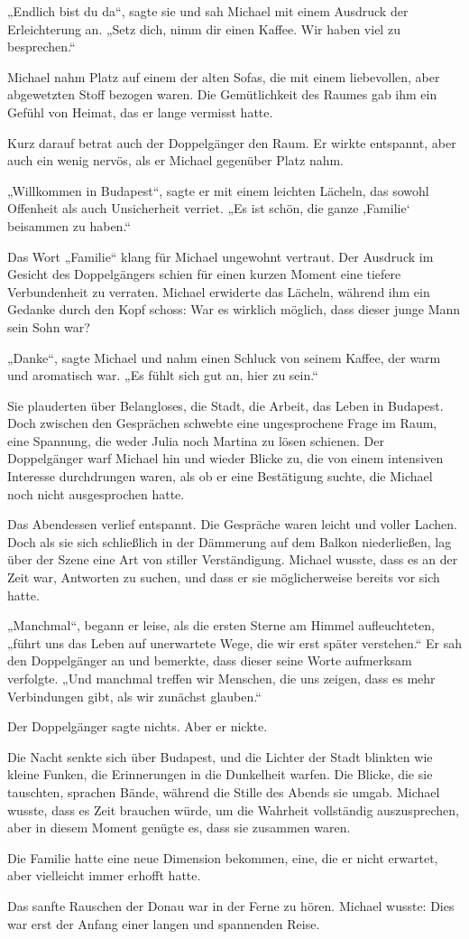 \documentclass[
]{article}
\begin{document}
„Endlich bist du da``, sagte sie und sah Michael mit einem Ausdruck der Erleichterung an. „Setz dich, nimm dir einen Kaffee. Wir haben viel zu besprechen.``

Michael nahm Platz auf einem der alten Sofas, die mit einem liebevollen, aber abgewetzten Stoff bezogen waren. Die Gemütlichkeit des Raumes gab ihm ein Gefühl von Heimat, das er lange vermisst hatte.

Kurz darauf betrat auch der Doppelgänger den Raum. Er wirkte entspannt, aber auch ein wenig nervös, als er Michael gegenüber Platz nahm.

„Willkommen in Budapest``, sagte er mit einem leichten Lächeln, das sowohl Offenheit als auch Unsicherheit verriet. „Es ist schön, die ganze ‚Familie` beisammen zu haben.``

Das Wort „Familie`` klang für Michael ungewohnt vertraut. Der Ausdruck im Gesicht des Doppelgängers schien für einen kurzen Moment eine tiefere Verbundenheit zu verraten. Michael erwiderte das Lächeln, während ihm ein Gedanke durch den Kopf schoss: War es wirklich möglich, dass dieser junge Mann sein Sohn war?

„Danke``, sagte Michael und nahm einen Schluck von seinem Kaffee, der warm und aromatisch war. „Es fühlt sich gut an, hier zu sein.``



Sie plauderten über Belangloses, die Stadt, die Arbeit, das Leben in Budapest. Doch zwischen den Gesprächen schwebte eine ungesprochene Frage im Raum, eine Spannung, die weder Julia noch Martina zu lösen schienen. Der Doppelgänger warf Michael hin und wieder Blicke zu, die von einem intensiven Interesse durchdrungen waren, als ob er eine Bestätigung suchte, die Michael noch nicht ausgesprochen hatte.

Das Abendessen verlief entspannt. Die Gespräche waren leicht und voller Lachen. Doch als sie sich schließlich in der Dämmerung auf dem Balkon niederließen, lag über der Szene eine Art von stiller Verständigung. Michael wusste, dass es an der Zeit war, Antworten zu suchen, und dass er sie möglicherweise bereits vor sich hatte.

„Manchmal``, begann er leise, als die ersten Sterne am Himmel aufleuchteten, „führt uns das Leben auf unerwartete Wege, die wir erst später verstehen.`` Er sah den Doppelgänger an und bemerkte, dass dieser seine Worte aufmerksam verfolgte. „Und manchmal treffen wir Menschen, die uns zeigen, dass es mehr Verbindungen gibt, als wir zunächst glauben.``

Der Doppelgänger sagte nichts. Aber er nickte.

Die Nacht senkte sich über Budapest, und die Lichter der Stadt blinkten wie kleine Funken, die Erinnerungen in die Dunkelheit warfen. Die Blicke, die sie tauschten, sprachen Bände, während die Stille des Abends sie umgab. Michael wusste, dass es Zeit brauchen würde, um die Wahrheit vollständig auszusprechen, aber in diesem Moment genügte es, dass sie zusammen waren.

Die Familie hatte eine neue Dimension bekommen, eine, die er nicht erwartet, aber vielleicht immer erhofft hatte.

Das sanfte Rauschen der Donau war in der Ferne zu hören. Michael wusste: Dies war erst der Anfang einer langen und spannenden Reise.
\end{document}
